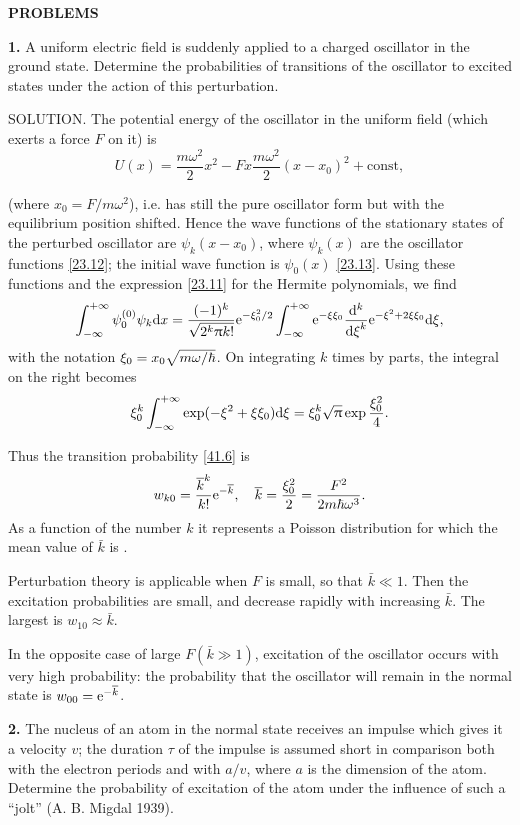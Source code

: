 {\small
\textbf{PROBLEMS}


\textbf{1.} A uniform electric field is suddenly applied to a charged oscillator in the ground state. Determine the probabilities of transitions of the oscillator to excited states under the action of this perturbation.





SOLUTION. The potential energy of the oscillator in the uniform field (which exerts a force $ F $ on it) is
\[ U(x)=\frac{m\omega^2}{2}x^2-Fx\frac{m\omega^2}{2}(x-x_0)^2+\mathrm{const}, \]



(where $ x_0 = F/m\omega^2 $), i.e. has still the pure oscillator form but with the equilibrium position shifted. Hence the wave functions of the stationary states of the perturbed oscillator are $ \psi_k(x - x_0) $, where $ \psi_k(x) $ are the oscillator functions \eqref{23.12}; the initial wave function is $ \psi_0(x) $ \eqref{23.13}. Using these functions and the expression \eqref{23.11} for the Hermite polynomials, we find
\[ \int_{-\infty}^{+\infty}\psi_0^{(0)}\psi_k\mathrm{d} x=\frac{(-1)^k}{\sqrt{2^k\uppi k!}}\mathrm{e}^{-\xi_0^2/2}\int_{-\infty}^{+\infty}\mathrm{e}^{-\xi\xi_0}\frac{\mathrm{d}^k}{{\mathrm{d} \xi}^k}\mathrm{e}^{-\xi^2+2\xi\xi_0}\mathrm{d}\xi, \]
with the notation $ \xi_0 = x_0 \sqrt{m\omega/\hbar} $. On integrating $ k $ times by parts, the integral on the right becomes
\[ \xi_0^k\int_{-\infty}^{+\infty}\exp(-\xi^2+\xi\xi_0)\mathrm{d}\xi=\xi_0^k\sqrt{\uppi}\exp\frac{\xi_0^2}{4}. \]



Thus the transition probability \eqref{41.6} is
\[ w_{k0}=\frac{\overline{k}^k}{k!}\mathrm{e}^{-\overline{k}},\quad\overline{k}=\frac{\xi_0^2}{2}=\frac{F^2}{2m\hbar\omega^3}. \]
As a function of the number $ k $ it represents a Poisson distribution for which the mean value of $\bar{k}$ is .

Perturbation theory is applicable when $ F $ is small, so that $ \bar{k}\ll1 $. Then the excitation probabilities are small, and decrease rapidly with increasing $ \bar{k} $. The largest is $ w_{10}\approx\bar{k} $.

In the opposite case of large $ F(\bar{k}\gg1) $, excitation of the oscillator occurs with very high probability: the probability that the oscillator will remain in the normal state is $ w_{00}=\mathrm{e}^{-\overline{k}} $.





\textbf{2.} The nucleus of an atom in the normal state receives an impulse which gives it a velocity $ v $; the duration $\tau$ of the impulse is assumed short in comparison both with the electron periods and with $ a/v $, where $ a $ is the dimension of the atom. Determine the probability of excitation of the atom under the influence of such a “jolt” (A. B. Migdal 1939).





}
